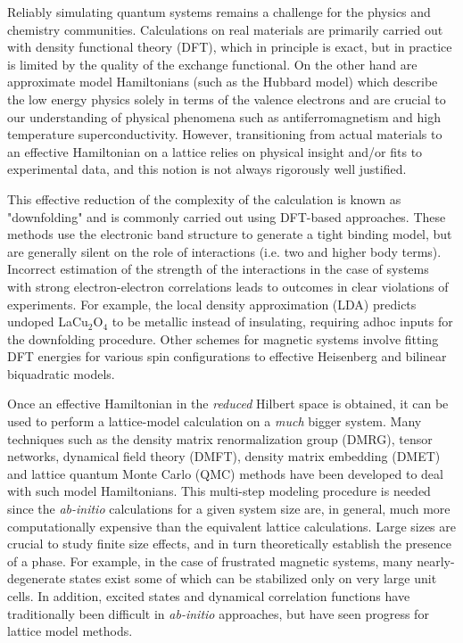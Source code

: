 \documentclass[prl,12pt,onecolumn,nofootinbib,notitlepage,english,superscriptaddress]{revtex4-1}
\begin{document}
Reliably simulating quantum systems remains a challenge 
for the physics and chemistry communities. Calculations on real materials 
are primarily carried out with density functional theory (DFT), 
which in principle is exact, but in practice is limited by the quality of the exchange functional. 
On the other hand are approximate model Hamiltonians (such as the Hubbard model) 
which describe the low energy physics solely in terms of the valence electrons and 
are crucial to our understanding of physical phenomena such 
as antiferromagnetism and high temperature superconductivity. 
However, transitioning from actual materials to an effective Hamiltonian on a lattice relies 
on physical insight and/or fits to experimental data, and this notion is not always rigorously well justified.
 
This effective reduction of the complexity of the calculation is known as "downfolding" 
and is commonly carried out using DFT-based approaches. 
These methods use the electronic band structure to generate a tight binding model, 
but are generally silent on the role of interactions (i.e. two and higher body terms). 
Incorrect estimation of the strength of the interactions 
in the case of systems with strong electron-electron correlations leads to 
outcomes in clear violations of experiments. For example, the local density 
approximation (LDA) predicts undoped LaCu$_2$O$_4$ 
to be metallic instead of insulating, requiring adhoc inputs for 
the downfolding procedure. Other schemes for magnetic systems involve fitting DFT energies for 
various spin configurations to effective Heisenberg and bilinear biquadratic models.    

Once an effective Hamiltonian in the \emph{reduced} Hilbert space 
is obtained, it can be used to perform a lattice-model calculation 
on a \emph{much} bigger system. Many techniques such as the density matrix 
renormalization group (DMRG), tensor networks, 
dynamical field theory (DMFT), density matrix embedding (DMET) 
and lattice quantum Monte Carlo (QMC) methods
have been developed to deal with such model Hamiltonians. 
This multi-step modeling procedure is needed since the \emph{ab-initio} 
calculations for a given system size are, in general, much more 
computationally expensive than the equivalent lattice calculations. 
Large sizes are crucial to study finite size effects, and in turn 
theoretically establish the presence of a phase. For example, in the case of 
frustrated magnetic systems, many nearly-degenerate states exist some of which can be 
stabilized only on very large unit cells. 
In addition, excited states and dynamical correlation functions have traditionally 
been difficult in \emph{ab-initio} approaches, 
but have seen progress for lattice model methods.
\end{document}
